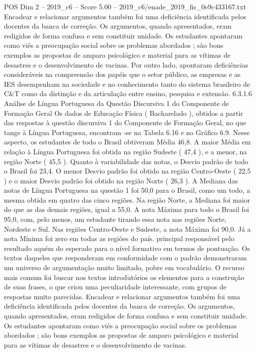 \begin{textsample}{POS Dim 2 – 2019\_c6 – Score 5.00 – 2019\_c6/enade\_2019\_fis\_0e9c433167.txt}
Encadear e relacionar argumentos também foi uma deficiência identificada pelos docentes da banca de correção.
Os argumentos, quando apresentados, eram redigidos de forma confusa e sem constituir unidade.
Os estudantes apontaram como viés a preocupação social sobre os problemas abordados ; são bons exemplos as propostas de amparo psicológico e material para as vítimas de desastres e o desenvolvimento de vacinas.
Por outro lado, apontaram deficiências consideráveis na compreensão dos papéis que o setor público, as empresas e as IES desempenham na sociedade e no conhecimento tanto do sistema brasileiro de C\&T como da distinção e da articulação entre ensino, pesquisa e extensão. 6.3.1.6 Análise de Língua Portuguesa da Questão Discursiva 1 do Componente de Formação Geral Os dados de Educação Física ( Bacharelado ), obtidos a partir das respostas à questão discursiva 1 do Componente de Formação Geral, no que tange à Língua Portuguesa, encontram -se na Tabela 6.16 e no Gráfico 6.9.
Nesse aspecto, os estudantes de todo o Brasil obtiveram Média 46,8.
A maior Média em relação à Língua Portuguesa foi obtida na região Sudeste ( 47,4 ), e a menor, na região Norte ( 45,5 ).
Quanto à variabilidade das notas, o Desvio padrão de todo o Brasil foi 23,4.
O menor Desvio padrão foi obtido na região Centro-Oeste ( 22,5 ) e o maior Desvio padrão foi obtido na região Norte ( 26,3 ).
A Mediana das notas de Língua Portuguesa na questão 1 foi 50,0 para o Brasil, como um todo, a mesma obtida em quatro das cinco regiões.
Na região Norte, a Mediana foi maior do que as das demais regiões, igual a 55,0.
A nota Máxima para todo o Brasil foi 95,0, com, pelo menos, um estudante tirando essa nota nas regiões Norte, Nordeste e Sul.
Nas regiões Centro-Oeste e Sudeste, a nota Máxima foi 90,0.
Já a nota Mínima foi zero em todas as regiões do país. principal responsável pelo resultado aquém do esperado para o nível formativo em termos de pontuação.
Os textos daqueles que responderam em conformidade com o padrão demonstraram um universo de argumentação muito limitado, pobre em vocabulário.
O recurso mais comum foi buscar nos textos introdutórios os elementos para a construção de suas frases, o que criou uma peculiaridade interessante, com grupos de respostas muito parecidas.
Encadear e relacionar argumentos também foi uma deficiência identificada pelos docentes da banca de correção.
Os argumentos, quando apresentados, eram redigidos de forma confusa e sem constituir unidade.
Os estudantes apontaram como viés a preocupação social sobre os problemas abordados ; são bons exemplos as propostas de amparo psicológico e material para as vítimas de desastres e o desenvolvimento de vacinas.

\end{textsample}
